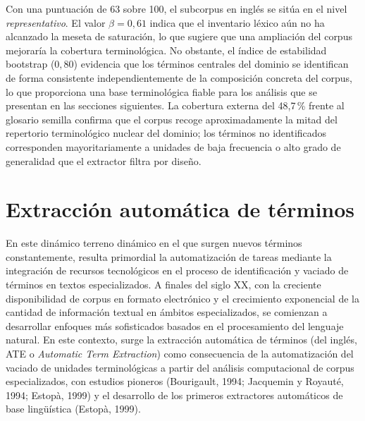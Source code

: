 Con una puntuación de 63 sobre 100, el subcorpus en inglés se sitúa en el
nivel \textit{representativo}. El valor $\beta = 0{,}61$ indica que el
inventario léxico aún no ha alcanzado la meseta de saturación, lo que sugiere
que una ampliación del corpus mejoraría la cobertura terminológica. No
obstante, el índice de estabilidad bootstrap ($0{,}80$) evidencia que los
términos centrales del dominio se identifican de forma consistente
independientemente de la composición concreta del corpus, lo que proporciona
una base terminológica fiable para los análisis que se presentan en las
secciones siguientes. La cobertura externa del 48,7\,\% frente al glosario
semilla confirma que el corpus recoge aproximadamente la mitad del repertorio
terminológico nuclear del dominio; los términos no identificados corresponden
mayoritariamente a unidades de baja frecuencia o alto grado de generalidad
que el extractor filtra por diseño.

\section{Extracción automática de términos}\label{sec:ate}

En este dinámico terreno dinámico en el que surgen nuevos términos constantemente, resulta primordial la automatización de tareas mediante la integración de recursos tecnológicos en el proceso de identificación y vaciado de términos en textos especializados. A finales del siglo XX, con la creciente disponibilidad de corpus en formato electrónico y el crecimiento exponencial de la cantidad de información textual en ámbitos especializados, se comienzan a desarrollar enfoques más sofisticados basados en el procesamiento del lenguaje natural. En este contexto, surge la extracción automática de términos (del inglés, ATE o \emph{Automatic Term Extraction}) como consecuencia de la automatización del vaciado de unidades terminológicas a partir del análisis computacional de corpus especializados, con estudios pioneros (Bourigault, 1994; Jacquemin y Royauté, 1994; Estopà, 1999) y el desarrollo de los primeros extractores automáticos de base lingüística (Estopà, 1999).

